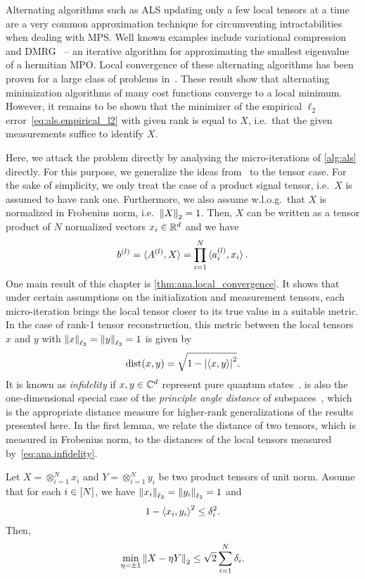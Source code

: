 Alternating algorithms such as ALS updating only a few local tensors at a time are a very common approximation technique for circumventing intractabilities when dealing with MPS.
Well known examples include variational compression and DMRG~\cite{Schollwoeck_2011_DensityMatrix} --  an iterative algorithm for approximating the smallest eigenvalue of a hermitian MPO.
Local convergence of these alternating algorithms has been proven for a large class of problems in~\cite{Holtz,Rohwedder_2013_On}.
These result show that alternating minimization algorithms of many cost functions converge to a local minimum.
However, it remains to be shown that the minimizer of the empirical $\ell_2$ error~\eqref{eq:als.empirical_l2} with given rank is equal to $X$, i.e.\ that the given measurements suffice to identify $X$.

Here, we attack the problem directly by analysing the micro-iterations of \cref{alg:als} directly.
For this purpose, we generalize the ideas from~\cite{Zhong_2015_Efficient} to the tensor case.
For the sake of simplicity, we only treat the case of a product signal tensor, i.e.\ $X$ is assumed to have rank one.
Furthermore, we also assume w.l.o.g.\ that $X$ is normalized in Frobenius norm, i.e.\ ${\Vert X\Vert}_2 = 1$.
Then, $X$ can be written as a tensor product of $N$ normalized vectors $x_i \in {\mathbb{R}}^d$ and we have
\[
  b^{(l)} = \braket{A^{(l)}, X} = \prod_{i=1}^N \braket{a^{(l)}_i, x_i}.
  \label{eq:ana.b_as_product}
\]
One main result of this chapter is \cref{thm:ana.local_convergence}.
It shows that under certain assumptions on the initialization and measurement tensors, each micro-iteration brings the local tensor closer to its true value in a suitable metric.
In the case of rank-1 tensor reconstruction, this metric between the local tensors $x$ and $y$ with ${\Vert x\Vert}_{\ell_2} = {\Vert y\Vert}_{\ell_2} = 1$ is given by
\[
  \mathrm{dist}(x, y) = \sqrt{1 - {\left\vert\braket{x, y}\right\vert}^2}.
  \label{eq:ana.infidelity}
\]
It is known as \emph{infidelity} if $x, y \in {\mathbb{C}}^d$ represent pure quantum states~\cite{Nielsen_2010_Quantum}.
 is also the one-dimensional special case of the \emph{principle angle distance} of subspaces~\cite{Golub_2013_Matrix}, which is the appropriate distance measure for higher-rank generalizations of the results presented here.
In the first lemma, we relate the  distance of two tensors, which is measured in Frobenius norm, to the distances of the local tensors measured by~\eqref{eq:ana.infidelity}.
\begin{lemma}%
  \label{lem:ana.local_global_closeness}
  Let $X = \otimes_{i=1}^N x_i$ and $Y = \otimes_{i=1}^N y_i$ be two product tensors of unit norm.
  Assume that for each $i \in [N]$, we have ${\Vert x_i\Vert}_{\ell_2} = {\Vert y_i\Vert}_{\ell_2} = 1$ and
  \[
    \label{eq:ana.local_global_closeness.local_close}
    1 - \Braket{x_i, y_i}^2 \le \delta_i^2.
  \]
  Then,
  \[
    \min_{\eta = \pm 1} {\left\Vert X - \eta Y\right\Vert}_{2} \le \sqrt{2} \sum_{i=1}^N \delta_i.
  \]
\end{lemma}
